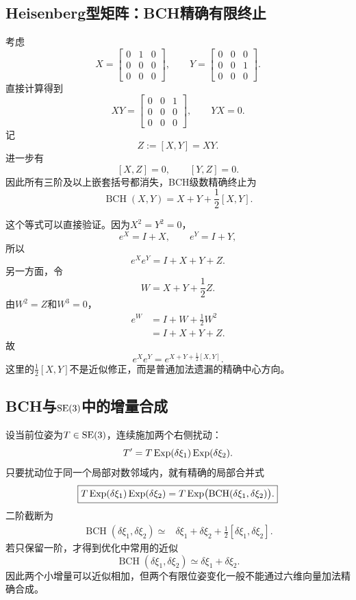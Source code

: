 \subsection{Heisenberg型矩阵：BCH精确有限终止}

考虑
\[
    X=
    \begin{bmatrix}
        0&1&0\\
        0&0&0\\
        0&0&0
    \end{bmatrix},
    \qquad
    Y=
    \begin{bmatrix}
        0&0&0\\
        0&0&1\\
        0&0&0
    \end{bmatrix}.
\]
直接计算得到
\[
    XY=
    \begin{bmatrix}
        0&0&1\\
        0&0&0\\
        0&0&0
    \end{bmatrix},
    \qquad
    YX=0.
\]
记
\[
    Z:=[X,Y]=XY.
\]
进一步有
\[
    [X,Z]=0,
    \qquad
    [Y,Z]=0.
\]
因此所有三阶及以上嵌套括号都消失，BCH级数精确终止为
\[
    \boxed{
    \operatorname{BCH}(X,Y)
    =X+Y+\frac12[X,Y].
    }
\]

这个等式可以直接验证。因为$X^2=Y^2=0$，
\[
    e^X=I+X,
    \qquad
    e^Y=I+Y,
\]
所以
\[
    e^Xe^Y=I+X+Y+Z.
\]
另一方面，令
\[
    W=X+Y+\frac12Z.
\]
由$W^2=Z$和$W^3=0$，
\[
\begin{aligned}
    e^W
    &=I+W+\frac12W^2\\
    &=I+X+Y+Z.
\end{aligned}
\]
故
\[
    \boxed{
    e^Xe^Y
    =e^{X+Y+\frac12[X,Y]}.
    }
\]
这里的$\frac12[X,Y]$不是近似修正，而是普通加法遗漏的精确中心方向。

\subsection{BCH与$\operatorname{SE}(3)$中的增量合成}

设当前位姿为$T\in\operatorname{SE}(3)$，连续施加两个右侧扰动：
\[
    T'
    =T\operatorname{Exp}(\delta\xi_1)\operatorname{Exp}(\delta\xi_2).
\]
只要扰动位于同一个局部对数邻域内，就有精确的局部合并式
\[
    \boxed{
    T\operatorname{Exp}(\delta\xi_1)\operatorname{Exp}(\delta\xi_2)
    =T\operatorname{Exp}\bigl(
        \operatorname{BCH}(\delta\xi_1,\delta\xi_2)
    \bigr).
    }
\]
二阶截断为
\[
\begin{aligned}
    \operatorname{BCH}(\delta\xi_1,\delta\xi_2)
    \simeq{}&\delta\xi_1+\delta\xi_2
    +\frac12[\delta\xi_1,\delta\xi_2].
\end{aligned}
\]
若只保留一阶，才得到优化中常用的近似
\[
    \operatorname{BCH}(\delta\xi_1,\delta\xi_2)
    \simeq\delta\xi_1+\delta\xi_2.
\]
因此两个小增量可以近似相加，但两个有限位姿变化一般不能通过六维向量加法精确合成。


